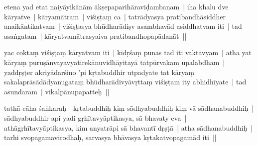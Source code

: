 \documentclass[article,12pt,a4paper]{memoir}%
\newcounter{parCount}
\begin{document}
	  \pstart \leavevmode%
	\label{thakur75-51.14}etena yad etat naiyāyikānām ākṣepaparihāraviḍambanam | iha khalu dve kāryatve | kāryamātram | viśiṣṭaṃ ca | tatrādyasya pratibandhāsiddher anaikāntikatvam | viśiṣṭasya bhūdharādiṣv asambhavād asiddhatvam iti | tad asaṅgatam | kāryatvamātrasyaiva pratibandhopapādanāt ||
	{}
	\pend%
      

	  \pstart \leavevmode%
	\label{thakur75-51.18}yac coktaṃ viśiṣṭaṃ kāryatvam iti | kīdṛśaṃ punas tad iti vaktavyam | atha yat kāryaṃ puruṣānvayavyatirekānuvidhāyitayā tatpūrvakam upalabdham | yaddṛṣṭer akriyādarśino 'pi kṛtabuddhir utpadyate tat kāryaṃ sakalaprāsādādyanugataṃ bhūdharādivyāvṛttaṃ viśiṣṭam ity abhidhīyate | tad asundaram | vikalpānupapatteḥ ||
	{}
	\pend%
      

	  \pstart \leavevmode%
	\label{thakur75-51.22}\label{sarit__ratnakīrtinibandhāvali__139880}tathā cāha śaṅkaraḥ—kṛtabuddhiḥ kiṃ sādhyabuddhiḥ kiṃ vā sādhanabuddhiḥ | sādhyabuddhir api yadi gṛhītavyāptikasya, sā bhavaty eva | athāgṛhītavyāptikasya, kim anyatrāpi sā bhavantī dṛṣṭā | atha sādhanabuddhiḥ | tarhi svopagamavirodhaḥ, sarvasya bhāvasya kṛtakatvopagamād iti ||\label{sarit__ratnakīrtinibandhāvali__140214}
	{}
	\pend%
      
\end{document}
